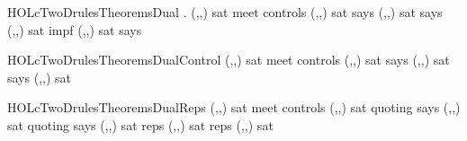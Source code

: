 \begin{SaveVerbatim}{HOLcTwoDrulesTheoremsDual}
\HOLTokenTurnstile{} \HOLTokenForall{}       .
     (,,) sat  meet  controls  \HOLTokenImp{}
     (,,) sat  says  \HOLTokenImp{}
     (,,) sat  says  \HOLTokenImp{}
     (,,) sat  impf  \HOLTokenImp{}
     (,,) sat  says 
\end{SaveVerbatim}
\newcommand{\HOLcTwoDrulesTheoremsDual}{\UseVerbatim{HOLcTwoDrulesTheoremsDual}}
\begin{SaveVerbatim}{HOLcTwoDrulesTheoremsDualControl}
\HOLTokenTurnstile{} (,,) sat  meet  controls  \HOLTokenImp{}
   (,,) sat  says  \HOLTokenImp{}
   (,,) sat  says  \HOLTokenImp{}
   (,,) sat 
\end{SaveVerbatim}
\newcommand{\HOLcTwoDrulesTheoremsDualControl}{\UseVerbatim{HOLcTwoDrulesTheoremsDualControl}}
\begin{SaveVerbatim}{HOLcTwoDrulesTheoremsDualReps}
\HOLTokenTurnstile{} (,,) sat  meet  controls  \HOLTokenImp{}
   (,,) sat  quoting  says  \HOLTokenImp{}
   (,,) sat  quoting  says  \HOLTokenImp{}
   (,,) sat reps    \HOLTokenImp{}
   (,,) sat reps    \HOLTokenImp{}
   (,,) sat 
\end{SaveVerbatim}
